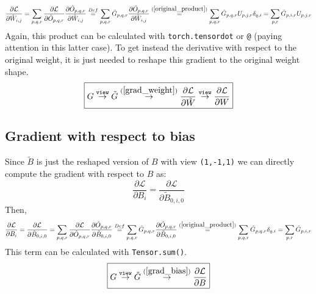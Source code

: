 \documentclass[11pt,titlepage]{article}
\begin{document}
\begin{equation} \label{grad_weight}
	\frac{\partial \mathcal{L}}{\partial \tilde{W}_{i,j}} = \sum_{p,q,r} \frac{\partial \mathcal{L}}{\partial \tilde{O}_{p,q,r}} \frac{\partial \tilde{O}_{p,q,r}}{\partial \tilde{W}_{i,j}} \overset{Def }{=} \sum_{p,q,r} \tilde{G}_{p,q,r} \frac{\partial \tilde{O}_{p,q,r}}{\partial \tilde{W}_{i,j}} \overset{(\ref{original_product}) }{=} \sum_{p,q,r} \tilde{G}_{p,q,r} U_{p,j,r} \delta_{q,i} = \sum_{p,r} \tilde{G}_{p,i,r} U_{p,j,r}
\end{equation}
Again, this product can be calculated with \texttt{torch.tensordot} or \texttt{@} (paying attention in this latter case). To get instead the derivative with respect to the original weight, it is just needed to reshape this gradient to the original weight shape.
\begin{equation*}
	\boxed{G \overset{\texttt{view}}{\rightarrow} \tilde{G} \overset{(\ref{grad_weight})}{\rightarrow} \frac{ \partial \mathcal{L}}{ \partial \tilde{W}} \overset{\texttt{view}}{\rightarrow} \frac{ \partial \mathcal{L}}{ \partial W} }
\end{equation*}


\subsection{Gradient with respect to bias}
Since $\tilde{B}$ is just the reshaped version of $B$ with view \texttt{(1,-1,1)} we can directly compute the gradient with respect to $B$ as:
\begin{equation*}
	\frac{\partial \mathcal{L}}{\partial B_{i}} = \frac{\partial \mathcal{L}}{\partial \tilde{B}_{0,i,0}} 
\end{equation*}
Then,
\begin{equation} \label{grad_bias}
	\frac{\partial \mathcal{L}}{\partial B_{i}} = \frac{\partial \mathcal{L}}{\partial \tilde{B}_{0,i,0}} = \sum_{p,q,r} \frac{\partial \mathcal{L}}{\partial \tilde{O}_{p,q,r}} \frac{\partial \tilde{O}_{p,q,r}}{\partial \tilde{B}_{0,i,0}} \overset{Def }{=} \sum_{p,q,r} \tilde{G}_{p,q,r} \frac{\partial \tilde{O}_{p,q,r}}{\partial \tilde{B}_{0,i,0}} \overset{(\ref{original_product}) }{=} \sum_{p,q,r} \tilde{G}_{p,q,r}  \delta_{q,i} = \sum_{p,r} \tilde{G}_{p,i,r}
\end{equation}
This term can be calculated with \texttt{Tensor.sum()}. 
\begin{equation*}
	\boxed{G \overset{\texttt{view}}{\rightarrow} \tilde{G} \overset{(\ref{grad_bias})}{\rightarrow} \frac{ \partial \mathcal{L}}{ \partial B}}
\end{equation*}
\end{document}

